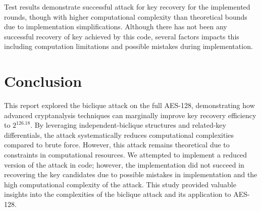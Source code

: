 \documentclass{report}
\begin{document}
Test results demonstrate successful attack for key recovery for the implemented rounds, though with higher computational complexity than theoretical bounds due to implementation simplifications. Although there has not been any successful recovery of key achieved by this code, several factors impacts this including computation limitations and possible mistakes during implementation.

\section{Conclusion}

This report explored the biclique attack on the full AES-128, demonstrating how advanced cryptanalysis techniques can marginally improve key recovery efficiency to 
$2^126.18$. By leveraging independent-biclique structures and related-key differentials, the attack systematically reduces computational complexities compared to brute force. However, this attack remains theoretical due to constraints in computational resources. We attempted to implement a reduced version of the attack in code; however, the implementation did not succeed in recovering the key candidates due to possible mistakes in implementation and the high computational complexity of the attack. This study provided valuable insights into the complexities of the biclique attack and its application to AES-128.


\end{document}
